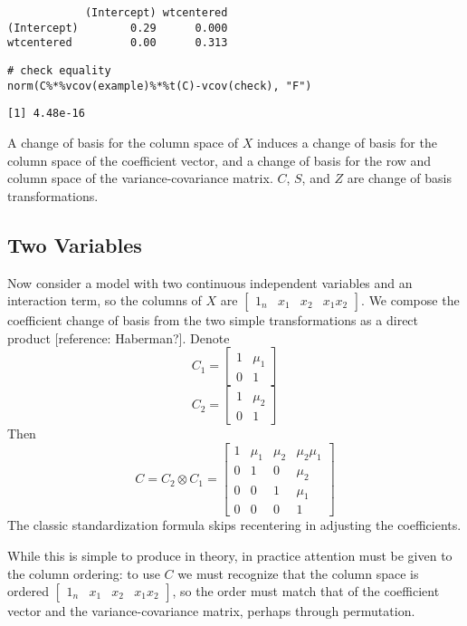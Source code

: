 \documentclass[]{article}
\begin{document}
\begin{verbatim}
            (Intercept) wtcentered
(Intercept)        0.29      0.000
wtcentered         0.00      0.313
\end{verbatim}

\begin{verbatim}
# check equality
norm(C%*%vcov(example)%*%t(C)-vcov(check), "F")
\end{verbatim}

\begin{verbatim}
[1] 4.48e-16
\end{verbatim}

A change of basis for the column space of \(X\) induces a change of
basis for the column space of the coefficient vector, and a change of
basis for the row and column space of the variance-covariance matrix.
\(C\), \(S\), and \(Z\) are change of basis transformations.

\hypertarget{two-variables}{%
\subsection{Two Variables}\label{two-variables}}

Now consider a model with two continuous independent variables and an
interaction term, so the columns of \(X\) are
\(\begin{bmatrix} 1_n &x_1 &x_2 &x_1x_2 \end{bmatrix}\). We compose the
coefficient change of basis from the two simple transformations as a
direct product {[}reference: Haberman?{]}. Denote
\[C_1=\begin{bmatrix}1 & \mu_1 \\ 0 & 1 \end{bmatrix}\]
\[C_2=\begin{bmatrix}1 & \mu_2 \\ 0 & 1 \end{bmatrix}\] Then
\[C = C_2 \otimes C_1 = \begin{bmatrix} 1 & \mu_1 &\mu_2 &\mu_2\mu_1 \\
  0 &1 &0 &\mu_2 \\ 0 &0 &1 &\mu_1 \\ 0 &0 &0 &1 \end{bmatrix}\] The
classic standardization formula skips recentering in adjusting the
coefficients.

While this is simple to produce in theory, in practice attention must be
given to the column ordering: to use \(C\) we must recognize that the
column space is ordered
\(\begin{bmatrix} 1_n &x_1 &x_2 &x_1x_2 \end{bmatrix}\), so the order
must match that of the coefficient vector and the variance-covariance
matrix, perhaps through permutation.
\end{document}
